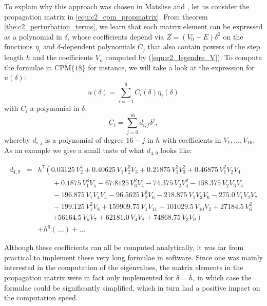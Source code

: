 To explain why this approach was chosen in Matslise and , let us consider the propagation matrix in \eqref{equ:c2_cpm_propmatrix}. From theorem \ref{the:c2_perturbation_terms}, we learn that each matrix element can be expressed as a polynomial in $\delta$, whose coefficients depend
via $Z=(V_0-E) \delta^2$ on the functions $\eta_i$ and $\delta$-dependent polynomials $C_j$ that also contain powers of the step length $h$ and the coefficients $V_n$ computed by (\ref{equ:c2_legendre_V}). To compute the formulae in $\text{CPM}\{18\}$ for instance, we will take a look at the expression for $u(\delta)$:
$$
    u(\delta) = \sum_{i = -1}^6 C_i(\delta) \eta_{i}(\delta)
$$
with $C_i$ a polynomial in $\delta$,
$$
    C_i  = \sum_{j=0}^{16} d_{i, j} \delta^j,
$$
whereby $d_{i, j}$ is a polynomial of degree $16-j$ in $h$ with coefficients in $V_1, \dots, V_{16}$. As an example we give a small taste of what $d_{4, 9}$ looks like:

\begin{eqnarray*}
    d_{4, 9}& =&  h^7 \left (0.03125 \, V_{2}^{4} + 0.40625 \, V_{1} V_{2}^{2} V_{3} + 0.21875 \, V_{1}^{2} V_{3}^{2} + 0.46875 \, V_{1}^{2} V_{2} V_{4} \right. \\
    &  & \qquad + 0.1875 \, V_{1}^{3} V_{5} - 67.8125 \, V_{3}^{2} V_{4} - 74.375 \, V_{2} V_{4}^{2} - 158.375 \, V_{2} V_{3} V_{5}         \\
    &  & \qquad - 196.875 \, V_{1} V_{4} V_{5} - 96.5625 \, V_{2}^{2} V_{6} - 218.875 \, V_{1} V_{3} V_{6} - 275.0 \, V_{1} V_{2} V_{7}     \\
    &  & \qquad - 199.125 \, V_{1}^{2} V_{8} + 159909.75 \, V_{1} V_{11} + 101029.5 \, V_{10} V_{2} + 27184.5 \, V_{6}^{2}                  \\
    &  & \qquad \left.+ 56164.5 \, V_{5} V_{7} + 62181.0 \, V_{4} V_{8} + 74868.75 \, V_{3} V_{9} \right)                                                 \\
    &  & + h^6 (\,\dots)  + \dots
\end{eqnarray*}


Although these coefficients can all be computed analytically, it was far from practical to implement these very long formulae in software. Since one was mainly interested in the computation of the eigenvalues, the matrix elements in the propagation matrix were in fact only implemented for $\delta=h$, in which case the formulae could be significantly simplified, which in turn had a positive impact on the computation speed.

